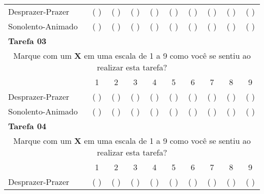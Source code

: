 \begin{table}[ht]
\begin{longtable}{llllllllll}
\cline{2-10}
\multicolumn{1}{p{7.2cm}}{Desprazer-Prazer} & \multicolumn{1}{c}{( )} & \multicolumn{1}{c}{( )} & \multicolumn{1}{c}{( )} & \multicolumn{1}{c}{( )} & \multicolumn{1}{c}{( )} & \multicolumn{1}{c}{( )} & \multicolumn{1}{c}{( )} & \multicolumn{1}{c}{( )} & \multicolumn{1}{c}{( )} \\ 
\multicolumn{1}{p{7.2cm}}{Sonolento-Animado} & \multicolumn{1}{c}{( )} & \multicolumn{1}{c}{( )} & \multicolumn{1}{c}{( )} & \multicolumn{1}{c}{( )} & \multicolumn{1}{c}{( )} & \multicolumn{1}{c}{( )} & \multicolumn{1}{c}{( )} & \multicolumn{1}{c}{( )} & \multicolumn{1}{c}{( )} \\ 
\multicolumn{10}{l}{\textbf{Tarefa 03}} \\ 
\multicolumn{10}{c}{Marque com um \textbf{X} em uma escala de 1 a 9 como você se sentiu ao realizar esta tarefa?} \\ 
\cline{2-10}
\multicolumn{1}{l|}{} & \multicolumn{1}{c|}{1} & \multicolumn{1}{c|}{2} & \multicolumn{1}{c|}{3} & \multicolumn{1}{c|}{4} & \multicolumn{1}{c|}{5} & \multicolumn{1}{c|}{6} & \multicolumn{1}{c|}{7} & \multicolumn{1}{c|}{8} & \multicolumn{1}{c|}{9} \\ 
\cline{2-10}
\multicolumn{1}{p{7.2cm}}{Desprazer-Prazer} & \multicolumn{1}{c}{( )} & \multicolumn{1}{c}{( )} & \multicolumn{1}{c}{( )} & \multicolumn{1}{c}{( )} & \multicolumn{1}{c}{( )} & \multicolumn{1}{c}{( )} & \multicolumn{1}{c}{( )} & \multicolumn{1}{c}{( )} & \multicolumn{1}{c}{( )} \\ 
\multicolumn{1}{p{7.2cm}}{Sonolento-Animado} & \multicolumn{1}{c}{( )} & \multicolumn{1}{c}{( )} & \multicolumn{1}{c}{( )} & \multicolumn{1}{c}{( )} & \multicolumn{1}{c}{( )} & \multicolumn{1}{c}{( )} & \multicolumn{1}{c}{( )} & \multicolumn{1}{c}{( )} & \multicolumn{1}{c}{( )} \\ 
\multicolumn{10}{l}{\textbf{Tarefa 04}} \\ 
\multicolumn{10}{c}{Marque com um \textbf{X} em uma escala de 1 a 9 como você se sentiu ao realizar esta tarefa?} \\ 
\cline{2-10}
\multicolumn{1}{l|}{} & \multicolumn{1}{c|}{1} & \multicolumn{1}{c|}{2} & \multicolumn{1}{c|}{3} & \multicolumn{1}{c|}{4} & \multicolumn{1}{c|}{5} & \multicolumn{1}{c|}{6} & \multicolumn{1}{c|}{7} & \multicolumn{1}{c|}{8} & \multicolumn{1}{c|}{9} \\ 
\cline{2-10}
\multicolumn{1}{p{7.2cm}}{Desprazer-Prazer} & \multicolumn{1}{c}{( )} & \multicolumn{1}{c}{( )} & \multicolumn{1}{c}{( )} & \multicolumn{1}{c}{( )} & \multicolumn{1}{c}{( )} & \multicolumn{1}{c}{( )} & \multicolumn{1}{c}{( )} & \multicolumn{1}{c}{( )} & \multicolumn{1}{c}{( )} \\ 

\end{longtable}
\end{table}

